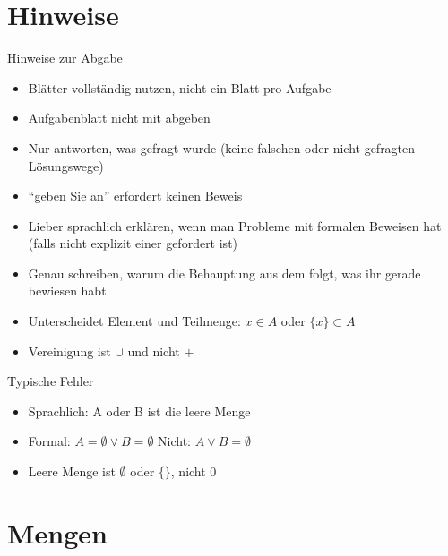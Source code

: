 \documentclass[handout]{beamer}
\begin{document}

\begin{frame}
	\titlepage
\end{frame}

\section{Hinweise}

\begin{frame}{Hinweise zur Abgabe}
	\begin{itemize}
		\item Blätter vollständig nutzen, nicht ein Blatt pro Aufgabe
		\item Aufgabenblatt nicht mit abgeben
		\item Nur antworten, was gefragt wurde (keine falschen oder nicht gefragten Lösungswege)
		\item "`geben Sie an"' erfordert keinen Beweis
		\item Lieber sprachlich erklären, wenn man Probleme mit formalen Beweisen hat (falls nicht explizit einer gefordert ist)
		\item Genau schreiben, warum die Behauptung aus dem folgt, was ihr gerade bewiesen habt
		\item Unterscheidet Element und Teilmenge: $x \in A$ oder $\{x\} \subset A$
		\item Vereinigung ist $\cup$ und nicht $+$
	\end{itemize}
\end{frame}

\begin{frame}{Typische Fehler}
	\begin{itemize}
		\item Sprachlich: A oder B ist die leere Menge
		\item Formal: $A = \emptyset \lor B = \emptyset$ Nicht: \sout{$A \lor B = \emptyset$}
		\item Leere Menge ist $\emptyset $ oder $\{\}$, nicht 0
	\end{itemize}
\end{frame}

\section{Mengen}
\end{document}
